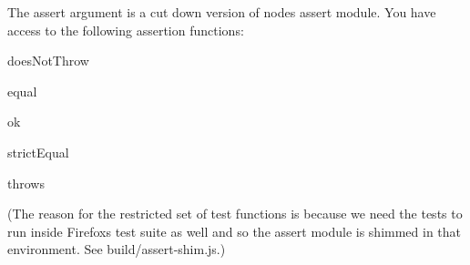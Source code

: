 The {\ttfamily assert} argument is a cut down version of node\textquotesingle{}s assert module. You have access to the following assertion functions\+:


\begin{DoxyItemize}
\item {\ttfamily does\+Not\+Throw}
\item {\ttfamily equal}
\item {\ttfamily ok}
\item {\ttfamily strict\+Equal}
\item {\ttfamily throws}
\end{DoxyItemize}

(The reason for the restricted set of test functions is because we need the tests to run inside Firefox\textquotesingle{}s test suite as well and so the assert module is shimmed in that environment. See {\ttfamily build/assert-\/shim.\+js}.) 